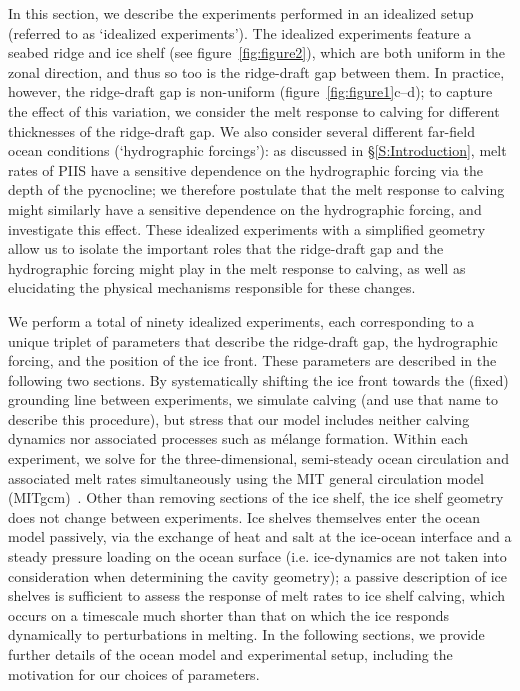 \documentclass[draft]{agujournal2019}
\begin{document}
In this section, we describe the experiments performed in an idealized setup (referred to as `idealized experiments'). The idealized experiments feature a seabed ridge and ice shelf (see figure~\ref{fig:figure2}), which are both uniform in the zonal direction, and thus so too is the ridge-draft gap between them. In practice, however, the ridge-draft gap is non-uniform (figure~\ref{fig:figure1}c--d); to capture the effect of this variation, we consider the melt response to calving for different thicknesses of the ridge-draft gap. We also consider several different far-field ocean conditions (`hydrographic forcings'): as discussed in \S\ref{S:Introduction}, melt rates of PIIS have a sensitive dependence on the hydrographic forcing via the depth of the pycnocline; we therefore postulate that the melt response to calving might similarly have a sensitive dependence on the hydrographic forcing, and investigate this effect. These idealized experiments with a simplified geometry allow us to isolate the important roles that the ridge-draft gap and the hydrographic forcing might play in the melt response to calving, as well as elucidating the physical mechanisms responsible for these changes. 

We perform a total of ninety idealized experiments, each corresponding to a unique triplet of parameters that describe the ridge-draft gap, the hydrographic forcing, and the position of the ice front. These parameters are described in the following two sections. By systematically shifting the ice front towards the (fixed) grounding line between experiments, we simulate calving (and use that name to describe this procedure), but stress that our model includes neither calving dynamics nor associated processes such as mélange formation. Within each experiment, we solve for the three-dimensional, semi-steady ocean circulation and associated melt rates simultaneously using the MIT general circulation model (MITgcm)~\cite{Marshall1997JGROceans}. Other than removing sections of the ice shelf, the ice shelf geometry does not change between experiments. Ice shelves themselves enter the ocean model passively, via the exchange of heat and salt at the ice-ocean interface and a steady pressure loading on the ocean surface (i.e. ice-dynamics are not taken into  consideration when determining the cavity geometry); a passive description of ice shelves is sufficient to assess the response of melt rates to ice shelf calving, which occurs on a timescale much shorter than that on which the ice responds dynamically to perturbations in melting. In the following sections, we provide further details of the ocean model and experimental setup, including the motivation for our choices of parameters.
\end{document}
